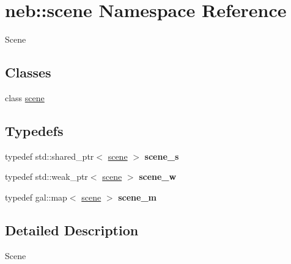\hypertarget{namespaceneb_1_1scene}{
\section{neb::scene Namespace Reference}
\label{namespaceneb_1_1scene}
}


Scene  
\subsection*{Classes}
\begin{DoxyCompactItemize}
\item 
class \hyperlink{classneb_1_1scene_1_1scene}{scene}
\end{DoxyCompactItemize}
\subsection*{Typedefs}
\begin{DoxyCompactItemize}
\item 
\hypertarget{namespaceneb_1_1scene_ad06b7e9387d18f1b35664adad68d352f}{
typedef std::shared\_\-ptr$<$ \hyperlink{classneb_1_1scene_1_1scene}{scene} $>$ {\bfseries scene\_\-s}}
\label{namespaceneb_1_1scene_ad06b7e9387d18f1b35664adad68d352f}

\item 
\hypertarget{namespaceneb_1_1scene_ac2d204a7fce21009499b360c1467e20d}{
typedef std::weak\_\-ptr$<$ \hyperlink{classneb_1_1scene_1_1scene}{scene} $>$ {\bfseries scene\_\-w}}
\label{namespaceneb_1_1scene_ac2d204a7fce21009499b360c1467e20d}

\item 
\hypertarget{namespaceneb_1_1scene_ad5e641229fe2e5f5ecf306021c841b3c}{
typedef gal::map$<$ \hyperlink{classneb_1_1scene_1_1scene}{scene} $>$ {\bfseries scene\_\-m}}
\label{namespaceneb_1_1scene_ad5e641229fe2e5f5ecf306021c841b3c}

\end{DoxyCompactItemize}


\subsection{Detailed Description}
Scene 